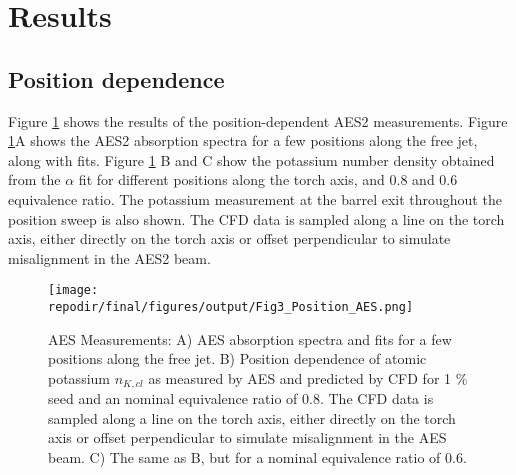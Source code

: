 

\section{Results}

\subsection{Position dependence}

Figure \ref{fig:pos_dependence_aes} shows the results of the position-dependent AES2 measurements. Figure \ref{fig:pos_dependence_aes}A shows the AES2 absorption spectra for a few positions along the free jet, along with fits. Figure \ref{fig:pos_dependence_aes} B and C show the potassium number density obtained from the $\alpha$ fit for different positions along the torch axis, and 0.8 and 0.6 equivalence ratio. The potassium measurement at the barrel exit throughout the position sweep is also shown. The CFD data is sampled along a line on the torch axis, either directly on the torch axis or offset perpendicular to simulate misalignment in the AES2 beam. 



\begin{figure}[h]
    \centering
    \texttt{[image: \\repodir/final/figures/output/Fig3\_Position\_AES.png]} 
    \caption{AES Measurements: A) AES absorption spectra and fits for a few positions along the free jet. B) Position dependence of atomic potassium $n_{K,cl}$ as measured by AES and predicted by CFD for 1 \% seed and an nominal equivalence ratio of 0.8. The CFD data is sampled along a line on the torch axis, either directly on the torch axis or offset perpendicular to simulate misalignment in the AES beam. C) The same as B, but for a nominal equivalence ratio of 0.6. }
    \label{fig:pos_dependence_aes}
\end{figure}

